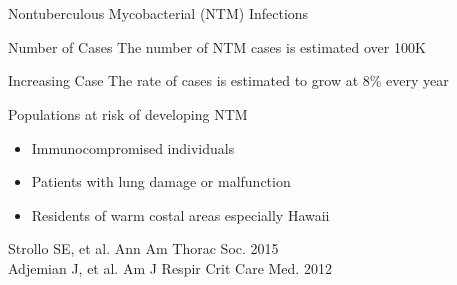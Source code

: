 \documentclass[11pt, xcolor=table]{beamer}
\begin{document}
\section{}


	\begin{frame}{Nontuberculous Mycobacterial (NTM) Infections}
	  
		\begin{block}{Number of Cases}
		The number of NTM cases is estimated over 100K
		\end{block}
		
		\begin{block}{Increasing Case}
		The rate of cases is estimated to grow at 8\% every year
		\end{block}
		
		
		\begin{block}{Populations at risk of developing NTM}
		\begin{itemize}
		\item Immunocompromised individuals 
		\item Patients with lung damage or malfunction 
		\item Residents of warm costal areas especially Hawaii
		\end{itemize}
		\end{block} 
		
		\begin{block}
		
		\end{block}
	\vspace{-1cm}
	\tiny{Strollo SE, et al. Ann Am Thorac Soc. 2015 \\
	Adjemian J, et al. Am J Respir Crit Care Med. 2012}
	
	\end{frame}
\end{document}
